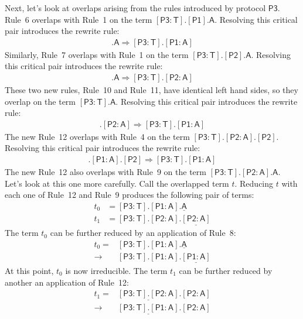 \documentclass[headsepline,bibliography=totoc]{scrreport}
\newcommand{\namesym}[1]{\mathsf{#1}}
\newcommand{\proto}[1]{\bm{\mathsf{#1}}}
\newcommand{\protosym}[1]{[\proto{#1}]}
\newcommand{\assocsym}[2]{[\proto{#1}\colon\namesym{#2}]}
\theoremstyle{definition}
\theoremstyle{definition}
\theoremstyle{definition}
\begin{document}
Next, let's look at overlaps arising from the rules introduced by protocol $\proto{P3}$. Rule~6 overlaps with Rule~1 on the term $\assocsym{P3}{T}.\protosym{P1}.\namesym{A}$. Resolving this critical pair introduces the rewrite rule:
\begin{align}
\assocsym{P3}{T}.\namesym{A}\Rightarrow\assocsym{P3}{T}.\assocsym{P1}{A}\tag{10}
\end{align}
Similarly, Rule~7 overlaps with Rule~1 on the term $\assocsym{P3}{T}.\protosym{P2}.\namesym{A}$. Resolving this critical pair introduces the rewrite rule:
\begin{align}
\assocsym{P3}{T}.\namesym{A}\Rightarrow\assocsym{P3}{T}.\assocsym{P2}{A}\tag{11}
\end{align}
These two new rules, Rule~10 and Rule~11, have identical left hand sides, so they overlap on the term $\assocsym{P3}{T}.\namesym{A}$. Resolving this critical pair introduces the rewrite rule:
\begin{align}
\assocsym{P3}{T}.\assocsym{P2}{A}\Rightarrow\assocsym{P3}{T}.\assocsym{P1}{A}\tag{12}
\end{align}
The new Rule~12 overlaps with Rule~4 on the term $\assocsym{P3}{T}.\assocsym{P2}{A}.\protosym{P2}$. Resolving this critical pair introduces the rewrite rule:
\begin{align}
\assocsym{P3}{T}.\assocsym{P1}{A}.\protosym{P2}\Rightarrow\assocsym{P3}{T}.\assocsym{P1}{A}\tag{13}
\end{align}
The new Rule~12 also overlaps with Rule~9 on the term $\assocsym{P3}{T}.\assocsym{P2}{A}.\namesym{A}$. Let's look at this one more carefully. Call the overlapped term $t$. Reducing $t$ with each one of Rule~12 and Rule~9 produces the following pair of terms:
\begin{align*}
t_0&=\assocsym{P3}{T}.\assocsym{P1}{A}.\underline{\namesym{A}}\\
t_1&=\assocsym{P3}{T}.\assocsym{P2}{A}.\underline{\assocsym{P2}{A}}
\end{align*}
The term $t_0$ can be further reduced by an application of Rule~8:
\begin{align*}
t_0=&\assocsym{P3}{T}.\assocsym{P1}{A}.\underline{\namesym{A}}\\
\rightarrow&\assocsym{P3}{T}.\assocsym{P1}{A}.\underline{\assocsym{P1}{A}}
\end{align*}
At this point, $t_0$ is now irreducible. The term $t_1$ can be further reduced by another an application of Rule~12:
\begin{align*}
t_1=&\underline{\assocsym{P3}{T}.\assocsym{P2}{A}}.\assocsym{P2}{A}\\
\rightarrow&\underline{\assocsym{P3}{T}.\assocsym{P1}{A}}.\assocsym{P2}{A}
\end{align*}
\end{document}
